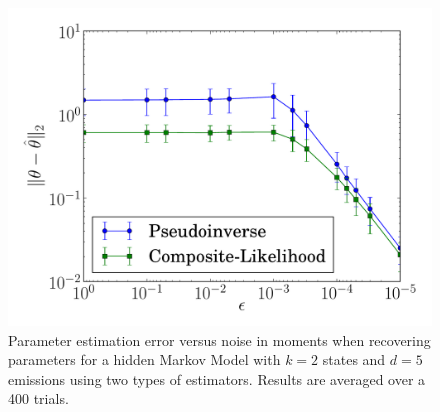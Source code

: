 %


\begin{figure}
  \centering
  \includegraphics[width=0.8\columnwidth]{figures/asymp-k2d5.pdf}
  \caption{Parameter estimation error versus noise in moments when recovering parameters for a hidden
  Markov Model with $k=2$ states and $d=5$ emissions using two types of estimators. Results are averaged over a 400 trials.}
    \label{fig:cl-hmm}
\end{figure}

